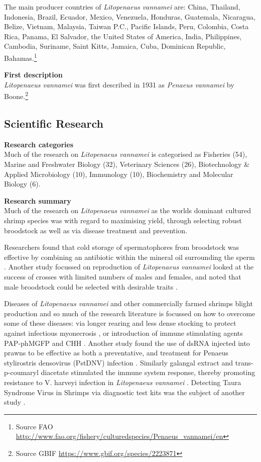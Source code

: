 \documentclass[]{book}
\theoremstyle{definition}
\theoremstyle{definition}
\theoremstyle{definition}
\theoremstyle{remark}
\begin{document}
The main producer countries of \emph{Litopenaeus vannamei} are: China,
Thailand, Indonesia, Brazil, Ecuador, Mexico, Venezuela, Honduras,
Guatemala, Nicaragua, Belize, Vietnam, Malaysia, Taiwan P.C., Pacific
Islands, Peru, Colombia, Costa Rica, Panama, El Salvador, the United
States of America, India, Philippines, Cambodia, Suriname, Saint Kitts,
Jamaica, Cuba, Dominican Republic, Bahamas.\footnote{Source FAO
  \url{http://www.fao.org/fishery/culturedspecies/Penaeus_vannamei/en}}

\textbf{First description}\\
\emph{Litopenaeus vannamei} was first described in 1931 as \emph{Penaeus
vannamei} by Boone.\footnote{Source GBIF
  \url{https://www.gbif.org/species/2223871}}

\hypertarget{scientific-research-2}{%
\subsection{Scientific Research}\label{scientific-research-2}}

\textbf{Research categories}\\
Much of the research on \emph{Litopenaeus vannamei} is categorised as
Fisheries (54), Marine and Freshwater Biology (32), Veterinary Sciences
(26), Biotechnology \& Applied Microbiology (10), Immunology (10),
Biochemistry and Molecular Biology (6).

\textbf{Research summary}\\
Much of the research on \emph{Litopenaeus vannamei} as the worlds
dominant cultured shrimp species was with regard to maximising yield,
through selecting robust broodstock as well as via disease treatment and
prevention.

Researchers found that cold storage of spermatophores from broodstock
was effective by combining an antibiotic within the mineral oil
surrounding the sperm \citep{Tuantong_2015}. Another study focussed on
reproduction of \emph{Litopenaeus vannamei} looked at the success of
crosses with limited numbers of males and females, and noted that male
broodstock could be selected with desirable traits
\citep{Aungsuchawan_2008}.

Diseases of \emph{Litopenaeus vannamei} and other commercially farmed
shrimps blight production and so much of the research literature is
focussed on how to overcome some of these diseases: via longer rearing
and less dense stocking to protect against infectious myonecrosis
\citet{Silva_2010}, or introduction of immune stimulating agents
PAP-phMGFP and CHH \citep{Silva_2010, Khimmakthong_2011, Wanlem_2011}.
Another study found the use of dsRNA injected into prawns to be
effective as both a preventative, and treatment for Penaeus stylirostris
densovirus (PstDNV) infection \citep{Ho_2011}. Similarly galangal
extract and trans-p-coumaryl diacetate stimulated the immune system
response, thereby promoting resistance to V. harveyi infection in
\emph{Litopenaeus vannamei} \citep{Chaweepack_2014}. Detecting Taura
Syndrome Virus in Shrimps via diagnostic test kits was the subject of
another study \citep{Chaivisuthangkura_2006}.
\end{document}

